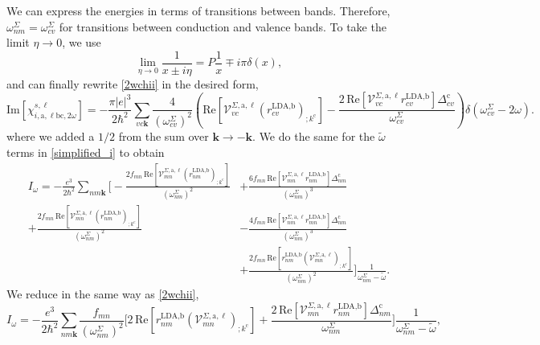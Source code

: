 We can express the energies in terms of transitions between bands. Therefore,
$\omega^{\Sigma}_{nm} = \omega^{\Sigma}_{cv}$ for transitions between conduction
and valence bands. To take the limit $\eta\to 0$, we use
\begin{equation}\label{limit_eta}
\lim_{\eta\to 0}\frac{1}{x\pm i\eta} = P\frac{1}{x}\mp i\pi\delta(x),
\end{equation}
and can finally rewrite \eqref{2wchii} in the desired form,
\begin{equation}\label{imchi2w}
    \mathrm{Im}[\chi_{i,\text{a},\ell\text{b}\text{c},2\omega}^{s,\ell}] 
=   -\frac{\pi \vert e\vert^{3}}{2\hbar^2}\sum_{vc\mathbf{k}}
    \frac{4}{(\omega^{\Sigma}_{cv})^{2}}\left(\mathrm{Re}
    \left[\mathcal{V}^{\Sigma,\text{a},\ell}_{vc}
    \left(r^{\text{LDA,b}}_{cv}\right)_{;k^{\text{c}}}\right] 
-   \frac{2\,\mathrm{Re}
    \left[
    \mathcal{V}^{\Sigma,\text{a},\ell}_{vc}r^{\text{LDA,b}}_{cv}
    \right]
    \Delta^{\text{c}}_{cv}}{\omega^{\Sigma}_{cv}}\right)
    \delta(\omega^{\Sigma}_{cv}-2\omega).
\end{equation}
where we added a $1/2$ from the sum over $\mathbf{k} \rightarrow - \mathbf{k}$.
We do the same for the $\tilde\omega$ terms in \eqref{simplified_i} to obtain
\begin{align}\label{wchii}
I_{\omega}
= -\frac{e^3}{2\hbar^2}\sum_{nm\mathbf{k}}
\Biggl[
-   \frac{2f_{mn}\,\mathrm{Re}\left[\mathcal{V}^{\Sigma,\text{a},\ell}_{mn}
    \left(r^{\text{LDA,b}}_{nm}\right)_{;k^{\text{c}}}\right]}
    {(\omega^{\Sigma}_{nm})^{2}}
&+  \frac{6f_{mn}\,\mathrm{Re}\left[\mathcal{V}^{\Sigma,\text{a},\ell}_{mn}
    r^{\text{LDA,b}}_{nm}\right]
    \Delta^{\text{c}}_{nm}}{(\omega^{\Sigma}_{nm})^{3}}
    \nonumber\\
+   \frac{2f_{mn}\,\mathrm{Re}\left[\mathcal{V}^{\Sigma,\text{a},\ell}_{mn}
    \left(r^{\text{LDA,b}}_{nm}\right)_{;k^{\text{c}}}\right]}
    {(\omega^{\Sigma}_{nm})^{2}}
&-  \frac{4f_{mn}\,\mathrm{Re}\left[\mathcal{V}^{\Sigma,\text{a},\ell}_{nm}
    r^{\text{LDA,b}}_{mn}\right]
    \Delta_{nm}^{\text{c}}}{(\omega^{\Sigma}_{nm})^{3}}
    \nonumber\\
&+  \frac{2f_{mn}\,\mathrm{Re}\left[r^{\text{LDA,b}}_{nm}
    \left(\mathcal{V}^{\Sigma,\text{a},\ell}_{mn}\right)
    _{;k^{\text{c}}}\right]}{(\omega^{\Sigma}_{nm})^{2}}
\Biggr]\frac{1}{\omega^{\Sigma}_{nm}-\tilde\omega}.
\end{align}
We reduce in the same way as \eqref{2wchii}, 
\begin{equation}\label{wchii_simplified}
I_{\omega}
=   -\frac{e^3}{2\hbar^2}\sum_{nm\mathbf{k}}
    \frac{f_{mn}}{(\omega^{\Sigma}_{nm})^{2}}
\Biggl[
    2\,\mathrm{Re}\left[r^{\text{LDA,b}}_{nm}
    \left(\mathcal{V}^{\Sigma,\text{a},\ell}_{mn}\right)_{;k^{\text{c}}}\right]
+   \frac{2\,\mathrm{Re}\left[\mathcal{V}^{\Sigma,\text{a},\ell}_{mn}
    r^{\text{LDA,b}}_{nm}\right]\Delta^{\text{c}}_{nm}}{\omega^{\Sigma}_{nm}} 
\Biggr]\frac{1}{\omega^{\Sigma}_{nm}-\tilde\omega},
\end{equation}
